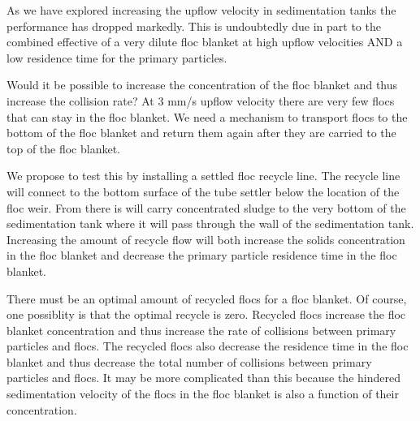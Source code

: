 \documentclass[letterpaper,10pt,english]{sphinxmanual}
\begin{document}
{As we have explored increasing the upflow velocity in sedimentation tanks the performance has dropped markedly. This is undoubtedly due in part to the combined effective of a very dilute floc blanket at high upflow velocities AND a low residence time for the primary particles.

Would it be possible to increase the concentration of the floc blanket and thus increase the collision rate? At 3 mm/s upflow velocity there are very few flocs that can stay in the floc blanket. We need a mechanism to transport flocs to the bottom of the floc blanket and return them again after they are carried to the top of the floc blanket.

We propose to test this by installing a settled floc recycle line. The recycle line will connect to the bottom surface of the tube settler below the location of the floc weir. From there is will carry concentrated sludge to the very bottom of the sedimentation tank where it will pass through the wall of the sedimentation tank. Increasing the amount of recycle flow will both increase the solids concentration in the floc blanket and decrease the primary particle residence time in the floc blanket.

There must be an optimal amount of recycled flocs for a floc blanket. Of course, one possiblity is that the optimal recycle is zero. Recycled flocs increase the floc blanket concentration and thus increase the rate of collisions between primary particles and flocs. The recycled flocs also decrease the residence time in the floc blanket and thus decrease the total number of collisions between primary particles and flocs. It may be more complicated than this because the hindered sedimentation velocity of the flocs in the floc blanket is also a function of their concentration.

}
\end{document}
